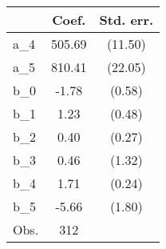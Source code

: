 {
\def\sym#1{\ifmmode^{#1}\else\(^{#1}\)\fi}
\begin{tabular}{l*{1}{cc}}
\hline\hline
                &    Coef.&Std. err.\\
\hline
a\_4             &   505.69&  (11.50)\\
a\_5             &   810.41&  (22.05)\\
b\_0             &    -1.78&   (0.58)\\
b\_1             &     1.23&   (0.48)\\
b\_2             &     0.40&   (0.27)\\
b\_3             &     0.46&   (1.32)\\
b\_4             &     1.71&   (0.24)\\
b\_5             &    -5.66&   (1.80)\\
\hline
Obs.            &      312&         \\
\hline\hline
\end{tabular}
}

